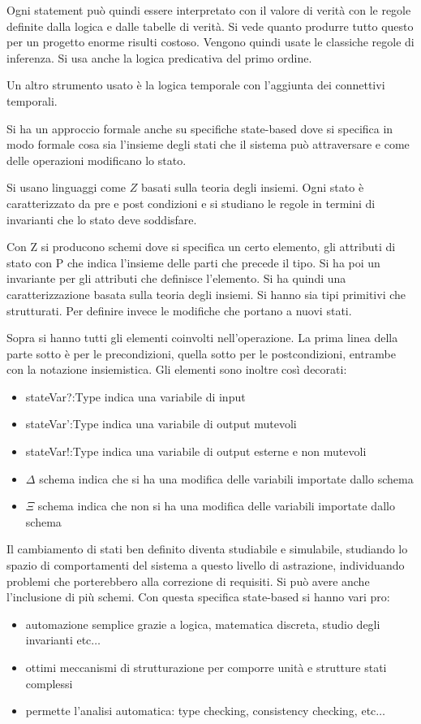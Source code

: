 Ogni statement può quindi essere interpretato con il valore di verità con le
regole definite dalla logica e dalle tabelle di verità. Si vede quanto produrre
tutto questo per un progetto enorme risulti costoso. Vengono quindi usate le
classiche regole di inferenza. Si usa anche la logica predicativa del primo ordine.

Un altro strumento usato è la logica temporale con l'aggiunta dei connettivi temporali.

Si ha un approccio formale anche su specifiche state-based dove si specifica in
modo formale cosa sia l'insieme degli stati che il sistema può attraversare e
come delle operazioni modificano lo stato.

Si usano linguaggi come $Z$ basati sulla teoria degli insiemi. Ogni stato è
caratterizzato da pre e post condizioni e si studiano le regole in termini di
invarianti che lo stato deve soddisfare.

Con Z si producono schemi dove si specifica un certo elemento, gli attributi di
stato con P che indica l'insieme delle parti che precede il tipo. Si ha poi un
invariante per gli attributi che definisce l'elemento. Si ha quindi una caratterizzazione
basata sulla teoria degli insiemi. Si hanno sia tipi primitivi che strutturati.
Per definire invece le modifiche che portano a nuovi stati.

Sopra si hanno tutti gli elementi coinvolti nell'operazione. La prima linea della
parte sotto è per le precondizioni, quella sotto per le postcondizioni, entrambe
con la notazione insiemistica. Gli elementi sono inoltre così decorati:
\begin{itemize}
      \item stateVar?:Type indica una variabile di input
      \item stateVar':Type indica una variabile di output mutevoli
      \item stateVar!:Type indica una variabile di output esterne e non mutevoli
      \item $\Delta$ schema indica che si ha una modifica delle variabili importate
            dallo schema
      \item $\Xi$ schema indica che non si ha una modifica delle variabili importate
            dallo schema
\end{itemize}

Il cambiamento di stati ben definito diventa studiabile e simulabile, studiando
lo spazio di comportamenti del sistema a questo livello di astrazione, individuando
problemi che porterebbero alla correzione di requisiti. Si può avere anche
l'inclusione di più schemi. Con questa specifica state-based si hanno vari pro:
\begin{itemize}
      \item automazione semplice grazie a logica, matematica discreta, studio degli
            invarianti etc$\dots$
      \item ottimi meccanismi di strutturazione per comporre unità e strutture
            stati complessi
      \item permette l'analisi automatica: type checking, consistency checking,
            etc$\dots$
\end{itemize}

